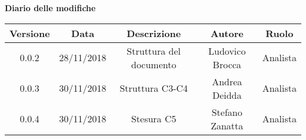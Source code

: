 \begin{center}
		\textbf{Diario delle modifiche}
	\end{center}
	\begin{center}
		\begin{tabular}{|c|c|c|c|c|}
			\hline
			\textbf{Versione} & \textbf{Data} & \textbf{Descrizione} & \textbf{Autore} & \textbf{Ruolo} \\
			\hline 
			0.0.2 & 28/11/2018 & Struttura del documento & Ludovico Brocca & Analista\\
			\hline
			0.0.3 & 30/11/2018 & Struttura C3-C4 & Andrea Deidda & Analista \\
			\hline
			0.0.4 & 30/11/2018 & Stesura C5 & Stefano Zanatta & Analista \\
			\hline
		\end{tabular}
	\end{center}
\newpage